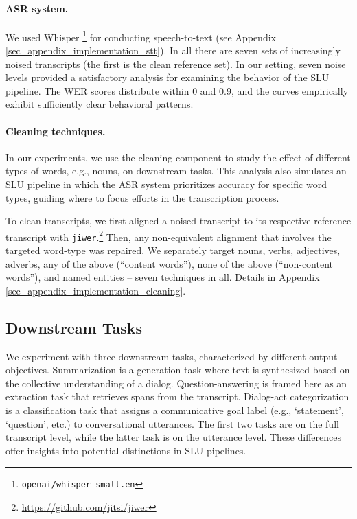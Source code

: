 \paragraph{ASR system.}
We used Whisper \citep{Radford2023whisper}\footnote{\texttt{openai/whisper-small.en}} for conducting speech-to-text (see Appendix \ref{sec_appendix_implementation_stt}). 
In all there are seven sets of increasingly noised transcripts (the first is the clean reference set). In our setting, seven noise levels provided a satisfactory analysis for examining the behavior of the SLU pipeline. The WER scores distribute within 0 and 0.9, and the curves empirically exhibit sufficiently clear behavioral patterns.

\paragraph{Cleaning techniques.}
In our experiments, we use the cleaning component to study the effect of different types of words, e.g., nouns, on downstream tasks. This analysis also simulates an SLU pipeline in which the ASR system prioritizes accuracy for specific word types, guiding where to focus efforts in the transcription process.

To clean transcripts, we first aligned a noised transcript to its respective reference transcript with \texttt{jiwer}.\footnote{\url{https://github.com/jitsi/jiwer}} Then, any non-equivalent alignment that involves the targeted word-type was repaired. We separately target nouns, verbs, adjectives, adverbs, any of the above (``content words''), none of the above (``non-content words''), and named entities -- seven techniques in all. Details in Appendix \ref{sec_appendix_implementation_cleaning}.


\subsection{Downstream Tasks}
\label{sec_setup_tasks}

We experiment with three downstream tasks, characterized by different output objectives. Summarization is a generation task where text is synthesized based on the collective understanding of a dialog. Question-answering is framed here as an extraction task that retrieves spans from the transcript. Dialog-act categorization is a classification task that assigns a communicative goal label (e.g., `statement', `question', etc.) to conversational utterances. The first two tasks are on the full transcript level, while the latter task is on the utterance level. These differences offer insights into potential distinctions in SLU pipelines.

